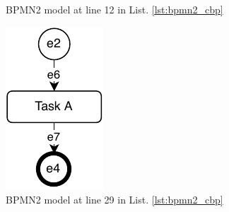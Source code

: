 \documentclass[conference]{IEEEtran}
\begin{document}
\begin{figure}[ht]
\begin{subfigure}[t]{0.14\linewidth}
        \caption{BPMN2 model at line 12 in List. \ref{lst:bpmn2_cbp}}
        \label{fig:bpmn2_12}
    \end{subfigure}
    \hfill
     \begin{subfigure}[t]{0.35\linewidth}
         \centering
         \includegraphics[width=\linewidth]{bpmn2_32}
         \caption{BPMN2 model at line 29 in List. \ref{lst:bpmn2_cbp}}
         \label{fig:bpmn2_29}
     \end{subfigure}
     \hfill
     \begin{subfigure}[t]{0.48\linewidth}
        \centering

\end{subfigure}
\end{figure}
\end{document}
